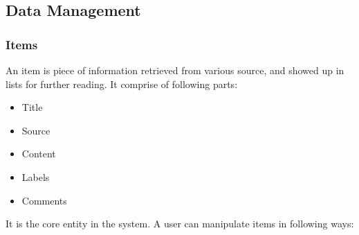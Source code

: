 
\subsection{Data Management}

\subsubsection{Items}

An item is piece of information retrieved from various source, and
showed up in lists for further reading. It comprise of following parts:

\begin{itemize}
\itemsep1pt\parskip0pt
\item
  Title
\item
  Source
\item
  Content
\item
  Labels
\item
  Comments
\end{itemize}

It is the core entity in the system. A user can manipulate items in
following ways:

